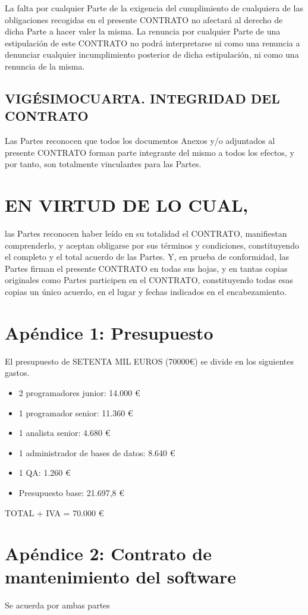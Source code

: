 \documentclass[a4paper,11pt]{report}
\newcommand{\change}[2]{\todo[linecolor=blue,backgroundcolor=blue!25,bordercolor=blue,#1]{#2}}
\begin{document}
	La falta por cualquier Parte de la exigencia del cumplimiento de
	cualquiera de las obligaciones recogidas en el presente CONTRATO no
	afectará al derecho de dicha Parte a hacer valer la misma. La renuncia
	por cualquier Parte de una estipulación de este CONTRATO no podrá
	interpretarse ni como una renuncia a denunciar cualquier incumplimiento
	posterior de dicha estipulación, ni como una renuncia de la misma.

	\subsection*{VIGÉSIMOCUARTA. INTEGRIDAD DEL CONTRATO}

	Las Partes reconocen que todos los documentos Anexos y/o adjuntados al
	presente CONTRATO forman parte integrante del mismo a todos los efectos,
	y por tanto, son totalmente vinculantes para las Partes.

	\section*{EN VIRTUD DE LO CUAL,}
	las Partes reconocen haber leído en su totalidad el CONTRATO, manifiestan
	comprenderlo, y aceptan obligarse por sus términos y condiciones,
	constituyendo el completo y el total acuerdo de las Partes. Y, en prueba de
	conformidad, las Partes firman el presente CONTRATO en todas sus hojas, y en
	tantas copias originales como Partes participen en el CONTRATO, constituyendo
	todas esas copias un único acuerdo, en el lugar y fechas indicados en el
	encabezamiento.

	\newpage
	\section*{Apéndice 1: Presupuesto}\label{apen_presu}
    El presupuesto de SETENTA MIL EUROS (70000\euro) se divide en los siguientes gastos.
    \begin{itemize}
        \item 2 programadores junior: 14.000 \euro
        \item 1 programador senior: 11.360 \euro
        \item 1 analista senior: 4.680 \euro
        \item 1 administrador de bases de datos: 8.640 \euro
        \item 1 QA: 1.260 \euro
        \item Presupuesto base: 21.697,8 \euro
    \end{itemize}
    TOTAL + IVA = 70.000 \euro
	\section*{Apéndice 2: Contrato de mantenimiento del software}
    Se acuerda por ambas partes\change{}{ACABAR ESTA PARTE}
\end{document}
